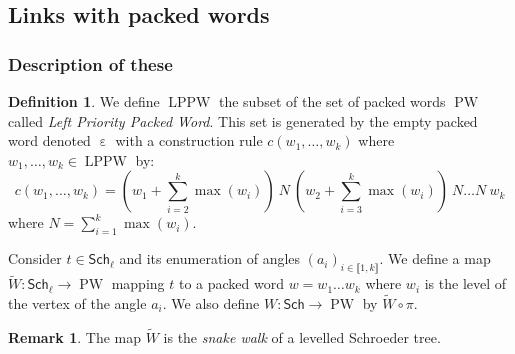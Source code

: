 \documentclass[a4paper,10pt]{amsart}
\DeclareMathOperator{\PW}{PW}
\DeclareMathOperator{\LPPW}{LPPW}
\DeclareMathOperator{\ew}{\varepsilon} %
\newcommand\Sch{\mathsf{Sch}}
\newcommand\Schl{\mathsf{Sch}_\ell}
\newcommand{\IEM}[2]{\llbracket #1,#2 \rrbracket}
\newcommand{\Schw}{Schroeder} %
\theoremstyle{definition}
\newtheorem{defi}{Definition}
\newtheorem{Rq}{Remark}
\begin{document}
\subsection{Links with packed words}

\subsubsection{Description of these}

\begin{defi}
	We define $\LPPW$ the subset of  the set of packed words $\PW$ called \emph{Left Priority Packed Word}. This set is generated by the empty packed word denoted $\ew$ with a construction rule $c(w_1,\dots,w_k)$ where $w_1,\dots, w_k\in\LPPW$ by:
	\[
	c(w_1,\dots,w_k) = \left(w_1+\sum_{i=2}^{k} \max(w_i)\right)~N~ \left(w_2 +\sum_{i=3}^{k} \max(w_i)\right)~N \dots N~ w_k
	\]
	where $N=\sum_{i=1}^{k} \max(w_i)$.
	
	Consider $t\in\Schl$ and its enumeration of angles $(a_i)_{i\in\IEM{1}{k}}$. We define a map $\tilde{W}:\Schl \rightarrow \PW$ mapping $t$ to a packed word $w=w_1\dots w_k$ where $w_i$ is the level of the vertex of the angle $a_i.$ We also define $W:\Sch \rightarrow \PW$ by $\tilde{W}\circ \pi$.
\end{defi}
\begin{Rq}
	The map $\tilde{W}$ is the \emph{snake walk} of a levelled \Schw{} tree.
\end{Rq}
\end{document}
